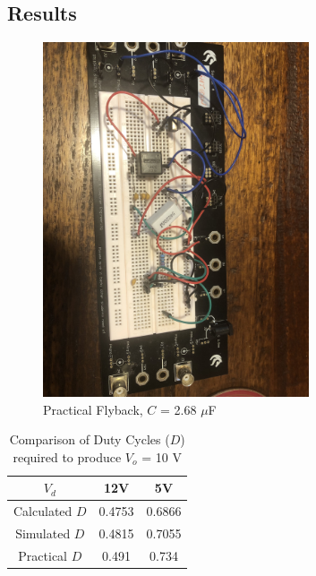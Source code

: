 \documentclass[12pt,twoside]{scrartcl}
\begin{document}
\subsection{Results}

\begin{figure}[htp]
    \centering
    \includegraphics[width=0.7\textwidth]{Flyback_Built.jpg}
    \caption{Practical Flyback, $C$ = 2.68 $\mu$F}
    \label{fig:Practical}
\end{figure}

\begin{table}[h!]
    \centering
    \caption{Comparison of Duty Cycles ($D$) required to produce $V_o$ = 10 V}
    \begin{tabular}{c|c c}
    $V_d$ & 12V & 5V \\
    \hline
    Calculated $D$ & 0.4753 & 0.6866 \\
    
    Simulated $D$ & 0.4815 & 0.7055 \\
    
    Practical $D$ & 0.491 & 0.734 \\
    
    \end{tabular}
    
    \label{tab:duty_cycle}
    \end{table}
    

\newpage
\end{document}
